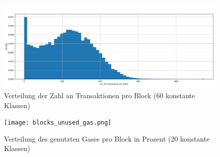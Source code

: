 \documentclass[runningheads]{llncs}
\begin{document}
\begin{figure}[h!]
  \centerline{\includegraphics[width=\textwidth, keepaspectratio]{blocks_transactions_per_block.png}}
  \caption{Verteilung der Zahl an Transaktionen pro Block (60 konstante Klassen) \cite{neemann_appendix_nodate}}
  \label{blocks_transactions_per_block}
\end{figure}

\begin{figure}[h!]
  \centerline{\texttt{[image: blocks\_unused\_gas.png]}}
  \caption{Verteilung des genutzten Gases pro Block in Prozent (20 konstante Klassen) \cite{neemann_appendix_nodate}}
  \label{blocks_transactions_per_block}
\end{figure}
\end{document}
